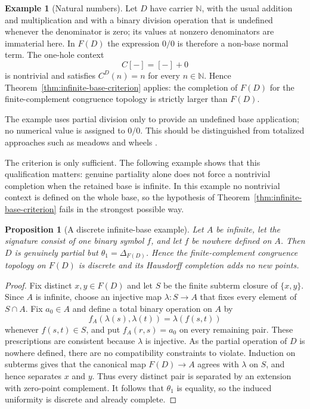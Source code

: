 \documentclass{birkau}
\newtheorem{proposition}[theorem]{Proposition}
\theoremstyle{definition}
\newtheorem{example}[theorem]{Example}
\theoremstyle{remark}
\begin{document}
\begin{example}[Natural numbers]\label{ex:natural-numbers}
Let $D$ have carrier $\mathbb N$, with the usual addition and multiplication
and with a binary division operation that is undefined whenever the denominator
is zero; its values at nonzero denominators are immaterial here.  In $F(D)$ the
expression $0/0$ is therefore a non-base normal term.  The one-hole context
\[
 C[-]=[-]+0
\]
is nontrivial and satisfies $C^D(n)=n$ for every $n\in\mathbb N$.  Hence
Theorem~\ref{thm:infinite-base-criterion} applies: the completion of $F(D)$ for
the finite-complement congruence topology is strictly larger than $F(D)$.
\end{example}

The example uses partial division only to provide an undefined base
application; no numerical value is assigned to $0/0$.  This should be
distinguished from totalized approaches such as meadows and wheels
\cite{BergstraHirshfeldTucker2009,Carlstrom2004}.

The criterion is only sufficient.  The following example shows that this
qualification matters: genuine partiality alone does not force a nontrivial
completion when the retained base is infinite.  In this example no nontrivial
context is defined on the whole base, so the hypothesis of
Theorem~\ref{thm:infinite-base-criterion} fails in the strongest possible way.

\begin{proposition}[A discrete infinite-base example]
\label{prop:discrete-example}
Let $A$ be infinite, let the signature consist of one binary symbol $f$, and
let $f$ be nowhere defined on $A$.  Then $D$ is genuinely partial but
$\theta_1=\Delta_{F(D)}$.  Hence the finite-complement congruence topology on
$F(D)$ is discrete and its Hausdorff completion adds no new points.
\end{proposition}

\begin{proof}
Fix distinct $x,y\in F(D)$ and let $S$ be the finite subterm closure of
$\{x,y\}$.  Since $A$ is infinite, choose an injective map
$\lambda:S\to A$ that fixes every element of $S\cap A$.  Fix $a_0\in A$ and
define a total binary operation on $A$ by
\[
 f_A(\lambda(s),\lambda(t))=\lambda(f(s,t))
\]
whenever $f(s,t)\in S$, and put $f_A(r,s)=a_0$ on every remaining pair.
These prescriptions are consistent because $\lambda$ is injective.  As the
partial operation of $D$ is nowhere defined, there are no compatibility
constraints to violate.  Induction on subterms gives that the canonical map
$F(D)\to A$ agrees with $\lambda$ on $S$, and hence separates $x$ and $y$.
Thus every distinct pair is separated by an extension with zero-point
complement.  It follows that $\theta_1$ is equality, so the induced uniformity
is discrete and already complete.
\end{proof}
\end{document}
